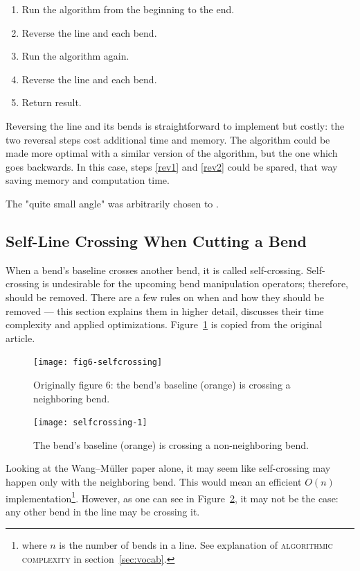 \documentclass[a4paper]{article}
\newcommand{\WM}{Wang--M{\"u}ller}
\begin{document}
\begin{enumerate}
    \item Run the algorithm from the beginning to the end.
    \item \label{rev1} Reverse the line and each bend.
    \item Run the algorithm again.
    \item \label{rev2} Reverse the line and each bend.
    \item Return result.
\end{enumerate}

Reversing the line and its bends is straightforward to implement but costly:
the two reversal steps cost additional time and memory. The algorithm could be
made more optimal with a similar version of the algorithm, but the one which
goes backwards. In this case, steps \ref{rev1} and \ref{rev2} could be spared,
that way saving memory and computation time.

The "quite small angle" was arbitrarily chosen to \smallAngle.

\subsection{Self-Line Crossing When Cutting a Bend}

When a bend's baseline crosses another bend, it is called self-crossing.
Self-crossing is undesirable for the upcoming bend manipulation operators; therefore,
should be removed. There are a few rules on when and how they should be removed
--- this section explains them in higher detail, discusses their time
complexity and applied optimizations. Figure~\ref{fig:fig6-selfcrossing} is
copied from the original article.

\begin{figure}[ht]
    \centering
    \texttt{[image: fig6-selfcrossing]}
    \caption{Originally figure 6: the bend's baseline (orange) is crossing a neighboring bend.}
    \label{fig:fig6-selfcrossing}
\end{figure}

\begin{figure}[ht]
    \centering
    \texttt{[image: selfcrossing-1]}
    \caption{The bend's baseline (orange) is crossing a non-neighboring bend.}
    \label{fig:selfcrossing-1-non-neighbor}
\end{figure}


Looking at the {\WM} paper alone, it may seem like self-crossing may happen
only with the neighboring bend. This would mean an efficient $O(n)$
implementation\footnote{where $n$ is the number of bends in a line. See
explanation of \textsc{algorithmic complexity} in section~\ref{sec:vocab}.}.
However, as one can see in Figure~\ref{fig:selfcrossing-1-non-neighbor}, it may
not be the case: any other bend in the line may be crossing it.
\end{document}
